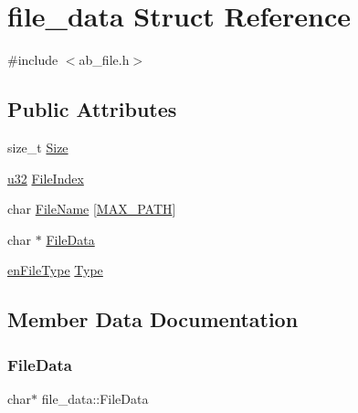 \hypertarget{structfile__data}{}\section{file\+\_\+data Struct Reference}
\label{structfile__data}


{\ttfamily \#include $<$ab\+\_\+file.\+h$>$}

\subsection*{Public Attributes}
\begin{DoxyCompactItemize}
\item 
size\+\_\+t \hyperlink{structfile__data_a72812241b55929a508538f596b52b7d7}{Size}
\item 
\hyperlink{ab__common_8h_afaa62991928fb9fb18ff0db62a040aba}{u32} \hyperlink{structfile__data_a8b5a3e4d5881e29760e77ac06d7f37c1}{File\+Index}
\item 
char \hyperlink{structfile__data_a3a1dc6a36635557387bc2f0c2e99b2b2}{File\+Name} \mbox{[}\hyperlink{ab__file_8h_ab99ded389af74001a6298fc9e44e74e5}{M\+A\+X\+\_\+\+P\+A\+TH}\mbox{]}
\item 
char $\ast$ \hyperlink{structfile__data_ab28b5cd0a1d3c6a5ecaddd7365012758}{File\+Data}
\item 
\hyperlink{ab__file_8h_a1b665fc63cb310d53283fbcd1b19746e}{en\+File\+Type} \hyperlink{structfile__data_a08ce87775b0af51c6462c969706cf58e}{Type}
\end{DoxyCompactItemize}


\subsection{Member Data Documentation}
\mbox{\label{structfile__data_ab28b5cd0a1d3c6a5ecaddd7365012758}} 
\subsubsection{\texorpdfstring{File\+Data}{FileData}}
{\footnotesize\ttfamily char$\ast$ file\+\_\+data\+::\+File\+Data}

\mbox{\label{structfile__data_a8b5a3e4d5881e29760e77ac06d7f37c1}} 
